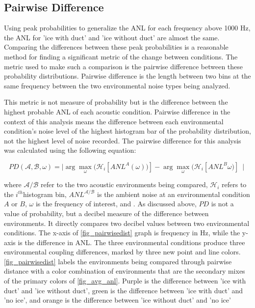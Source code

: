 \subsection{Pairwise Difference} \label{sec_pairdiff}

Using peak probabilities to generalize the ANL for each frequency above 1000 Hz, the ANL for 'ice with duct' and 'ice without duct' are almost the same. Comparing the differences between these peak probabilities is a reasonable method for finding a significant metric of the change between conditions. The metric used to make such a comparison is the pairwise difference between these probability distributions. Pairwise difference is the length between two bins at the same frequency between the two environmental noise types being analyzed. 

This metric is not measure of probability but is the difference between the highest probable ANL of each acoustic condition. Pairwise difference in the context of this analysis means the difference between each environmental condition's noise level of the highest histogram bar of the probability distribution, not the highest level of noise recorded. The pairwise difference for this analysis was calculated using the following equation:

\begin{equation}
PD(\mathcal{A},\mathcal{B},\omega)=\mid \arg \max_{\omega} (\mathcal{H}_{i} [ANL ^{A}(\omega))]- \arg\max_{\omega}(\mathcal{H}_{i} [ANL^{B}\omega)]\ \mid 	%
\end{equation}

where $\mathcal{A/B}$ refer to the two acoustic environments being compared, $\mathcal{H}_{i}$ refers to the $i^{th}$histogram bin, $ANL^{\mathcal{A/B}}$ is the ambient noise at an environmental condition $A$ or $B$, $\omega$ is the frequency of interest, and . As discussed above, $PD$ is not a value of probability, but a decibel measure of the difference between environments. It directly compares two decibel values between two environmental conditions. The x-axis of \autoref{fig_pairwisedist} graph is frequency in Hz, while the y-axis is the difference in ANL. The three environmental conditions produce three environmental coupling differences, marked by three new point and line colors. \autoref{fig_pairwisedist} labels the environments being compared through pairwise distance with a color combination of environments that are the secondary mixes of the primary colors of \autoref{fig_avg_anl}. Purple is the difference between 'ice with duct' and 'ice without duct', green is the difference between 'ice with duct' and 'no ice', and orange is the difference between 'ice without duct' and 'no ice'


